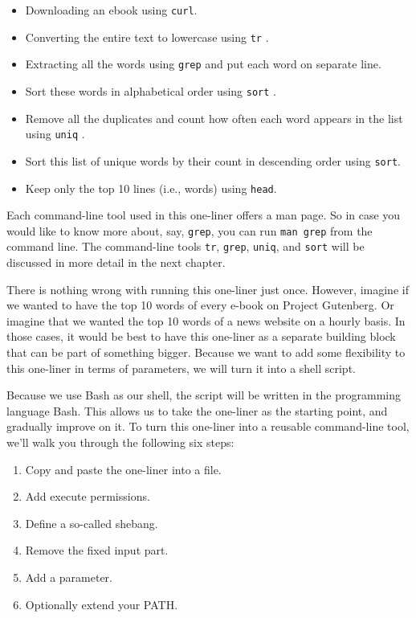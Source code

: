 \documentclass[
]{book}
\theoremstyle{definition}
\theoremstyle{definition}
\theoremstyle{definition}
\theoremstyle{remark}
\begin{document}
\begin{itemize}
\item
  Downloading an ebook using \texttt{curl}.
\item
  Converting the entire text to lowercase using \texttt{tr} \citep{tr}.
\item
  Extracting all the words using \texttt{grep} \citep{grep} and put each word on separate line.
\item
  Sort these words in alphabetical order using \texttt{sort} \citep{sort}.
\item
  Remove all the duplicates and count how often each word appears in the list using \texttt{uniq} \citep{uniq}.
\item
  Sort this list of unique words by their count in descending order using \texttt{sort}.
\item
  Keep only the top 10 lines (i.e., words) using \texttt{head}.
\end{itemize}

\begin{rmdtip}
Each command-line tool used in this one-liner offers a man page. So in case you would like to know more about, say, \texttt{grep}, you can run \texttt{man\ grep} from the command line. The command-line tools \texttt{tr}, \texttt{grep}, \texttt{uniq}, and \texttt{sort} will be discussed in more detail in the next chapter.
\end{rmdtip}

There is nothing wrong with running this one-liner just once. However, imagine if we wanted to have the top 10 words of every e-book on Project Gutenberg. Or imagine that we wanted the top 10 words of a news website on a hourly basis. In those cases, it would be best to have this one-liner as a separate building block that can be part of something bigger. Because we want to add some flexibility to this one-liner in terms of parameters, we will turn it into a shell script.

Because we use Bash as our shell, the script will be written in the programming language Bash. This allows us to take the one-liner as the starting point, and gradually improve on it. To turn this one-liner into a reusable command-line tool, we'll walk you through the following six steps:

\begin{enumerate}
\def\labelenumi{\arabic{enumi}.}
\item
  Copy and paste the one-liner into a file.
\item
  Add execute permissions.
\item
  Define a so-called shebang.
\item
  Remove the fixed input part.
\item
  Add a parameter.
\item
  Optionally extend your PATH.
\end{enumerate}
\end{document}
